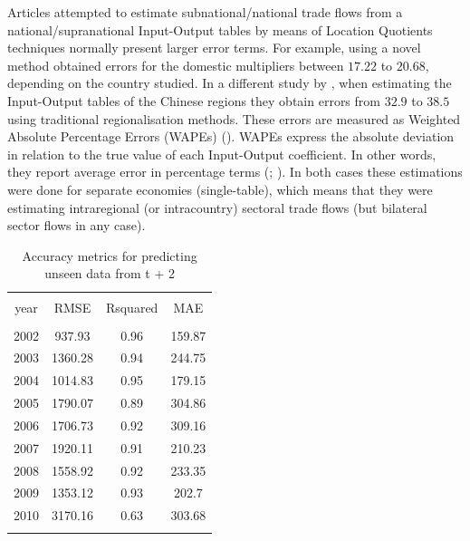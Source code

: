 \documentclass[]{interact}
\theoremstyle{plain}%
\theoremstyle{definition}
\theoremstyle{remark}
\begin{document}
Articles attempted to estimate subnational/national trade flows from a
national/supranational Input-Output tables by means of Location
Quotients techniques normally present larger error terms. For example,
\citet{pereira2020bidimensional} using a novel method obtained errors
for the domestic multipliers between \(17.22\) to \(20.68\), depending
on the country studied. In a different study by
\citet{jiang2012improved}, when estimating the Input-Output tables of
the Chinese regions they obtain errors from \(32.9\) to \(38.5\) using
traditional regionalisation methods. These errors are measured as
Weighted Absolute Percentage Errors (WAPEs)
(\citet{sawyer1983experiments}). WAPEs express the absolute deviation in
relation to the true value of each Input-Output coefficient. In other
words, they report average error in percentage terms
(\citet{lamonica2018performance}; \citet{pereira2020bidimensional}). In
both cases these estimations were done for separate economies
(single-table), which means that they were estimating intraregional (or
intracountry) sectoral trade flows (but bilateral sector flows in any
case).

\begin{table}[!htbp] \centering 
  \caption{Accuracy metrics  for predicting unseen data from t + 2\label{accuracy_test}} 
  \label{} 
\footnotesize 
\begin{tabular}{@{\extracolsep{0pt}} cccc} 
\\[-1.8ex]\hline 
\hline \\[-1.8ex] 
year & RMSE & Rsquared & MAE \\ 
\hline \\[-1.8ex] 
2002 & 937.93 & 0.96 & 159.87 \\ 
2003 & 1360.28 & 0.94 & 244.75 \\ 
2004 & 1014.83 & 0.95 & 179.15 \\ 
2005 & 1790.07 & 0.89 & 304.86 \\ 
2006 & 1706.73 & 0.92 & 309.16 \\ 
2007 & 1920.11 & 0.91 & 210.23 \\ 
2008 & 1558.92 & 0.92 & 233.35 \\ 
2009 & 1353.12 & 0.93 & 202.7 \\ 
2010 & 3170.16 & 0.63 & 303.68 \\ 
\hline \\[-1.8ex] 
\end{tabular} 
\end{table}
\end{document}
